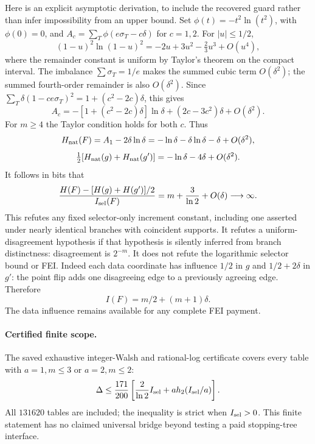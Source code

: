 \documentclass{article}
\begin{document}
Here is an explicit asymptotic derivation, to include the recovered guard
rather than infer impossibility from an upper bound. Set
$\phi(t)=-t^2\ln(t^2)$, with $\phi(0)=0$, and
$A_c=\sum_T\phi(e\sigma_T-c\delta)$ for $c=1,2$.
For $|u|\le1/2$,
\[
 (1-u)^2\ln(1-u)^2=-2u+3u^2-\tfrac23u^3+O(u^4),
\]
where the remainder constant is uniform by Taylor's theorem on the
compact interval. The imbalance $\sum\sigma_T=1/e$ makes the summed
cubic term $O(\delta^2)$; the summed fourth-order remainder is also
$O(\delta^2)$. Since
$\sum_T\delta(1-ce\sigma_T)^2=1+(c^2-2c)\delta$, this gives
\[
 A_c=-[1+(c^2-2c)\delta]\ln\delta
       +(2c-3c^2)\delta+O(\delta^2).
\]
For $m\ge4$ the Taylor condition holds for both $c$. Thus
\[
 H_{\rm nat}(F)=A_1-2\delta\ln\delta
     =-\ln\delta-\delta\ln\delta-\delta+O(\delta^2),
\]
\[
 \tfrac12[H_{\rm nat}(g)+H_{\rm nat}(g')]
       =-\ln\delta-4\delta+O(\delta^2).
\]
It follows in bits that
\[
 \frac{H(F)-[H(g)+H(g')]/2}{I_{\rm sel}(F)}
        =m+\frac3{\ln2}+O(\delta)\longrightarrow\infty.
\]
This refutes any fixed selector-only increment constant, including one
asserted under nearly identical branches with coincident supports.
It refutes a uniform-disagreement hypothesis if that hypothesis is
silently inferred from branch distinctness: disagreement is $2^{-m}$.
It does not refute the logarithmic selector bound or FEI. Indeed each
data coordinate has influence $1/2$ in $g$ and $1/2+2\delta$ in $g'$:
the point flip adds one disagreeing edge to a previously agreeing edge.
Therefore
\[
 I(F)=m/2+(m+1)\delta.
\]
The data influence remains available for any complete FEI payment.

\paragraph{Certified finite scope.}
The saved exhaustive integer-Walsh and rational-log certificate covers
every table with $a=1,m\le3$ or $a=2,m\le2$:
\[
 \Delta\le\frac{171}{200}
 \left[\frac2{\ln2}I_{\rm sel}+a h_2(I_{\rm sel}/a)\right].
\]
All $131620$ tables are included; the inequality is strict when
$I_{\rm sel}>0$. This finite statement has no claimed universal bridge
beyond testing a paid stopping-tree interface.
\end{document}
